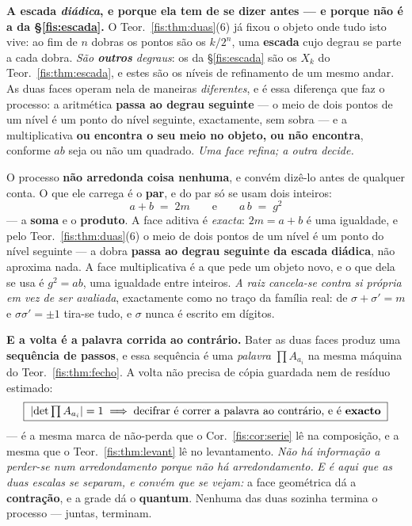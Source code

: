 \documentclass[livro.tex]{subfiles}
\begin{document}
\medskip\noindent\textbf{A escada \emph{diádica}, e porque ela tem de se dizer
antes --- e porque não é a da §\ref{fis:escada}.} O
Teor.~\ref{fis:thm:duas}(6) já fixou o objeto onde tudo isto vive: ao fim de $n$
dobras os pontos são os $k/2^{n}$, uma \textbf{escada} cujo degrau se parte a cada
dobra. \emph{São \textbf{outros} degraus}: os da §\ref{fis:escada} são os
$X_k$ do Teor.~\ref{fis:thm:escada}, e estes são os níveis de refinamento de um
mesmo andar. As duas faces operam nela de maneiras \emph{diferentes}, e é essa diferença
que faz o processo: a aritmética \textbf{passa ao degrau seguinte} --- o meio de dois
pontos de um nível é um ponto do nível seguinte, exactamente, sem sobra --- e a
multiplicativa \textbf{ou encontra o seu meio no objeto, ou não encontra}, conforme
$ab$ seja ou não um quadrado. \emph{Uma face refina; a outra decide.}
\begin{definicao}\label{fis:def:par}O processo \textbf{não arredonda coisa nenhuma}, e convém dizê-lo antes de
qualquer conta. O que ele carrega é o \textbf{par}, e do par só se usam dois
inteiros:
\[
\boxed{\;a+b \;=\; 2m \qquad\text{e}\qquad a\,b \;=\; g^{2}\;}
\]
--- a \textbf{soma} e o \textbf{produto}. A face aditiva é \emph{exacta}: $2m=a+b$
é uma igualdade, e pelo Teor.~\ref{fis:thm:duas}(6) o meio de dois pontos de um
nível é um ponto do nível seguinte --- a dobra \textbf{passa ao degrau seguinte da
escada diádica},
não aproxima nada. A face multiplicativa é a que pede um objeto novo, e o que dela
se usa é $g^{2}=ab$, uma igualdade entre inteiros. \emph{A raiz cancela-se contra
si própria em vez de ser avaliada}, exactamente como no traço da família real: de
$\sigma+\sigma'=m$ e $\sigma\sigma'=\pm1$ tira-se tudo, e $\sigma$ nunca é escrito
em dígitos.
\end{definicao}

\medskip\noindent\textbf{E a volta é a palavra corrida ao contrário.} Bater as
duas faces produz uma \textbf{sequência de passos}, e essa sequência é uma
\emph{palavra} $\prod A_{a_i}$ na mesma máquina do Teor.~\ref{fis:thm:fecho}. A
volta não precisa de cópia guardada nem de resíduo estimado:
\[
\boxed{\;\lvert \det \textstyle\prod A_{a_i}\rvert=1 \;\Longrightarrow\;
\text{decifrar é correr a palavra ao contrário, e é \textbf{exacto}}\;}
\]
--- é a mesma marca de não-perda que o Cor.~\ref{fis:cor:serie} lê na
composição, e a mesma que o Teor.~\ref{fis:thm:levant} lê no levantamento.
\emph{Não há informação a perder-se num arredondamento porque não há
arredondamento.}
\medskip\noindent\emph{E é aqui que as duas escalas se separam, e convém que se
vejam:} a face geométrica dá a \textbf{contração}, e a grade dá o
\textbf{quantum}. Nenhuma das duas sozinha termina o processo --- juntas,
terminam.
\end{document}
